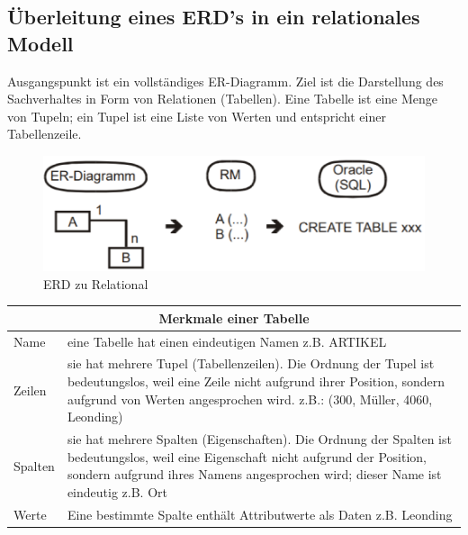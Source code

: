 \subsection{Überleitung eines ERD’s in ein relationales Modell}

Ausgangspunkt ist ein vollständiges ER-Diagramm. Ziel ist die Darstellung des Sachverhaltes in Form von Relationen (Tabellen). Eine Tabelle ist eine Menge von Tupeln; ein Tupel ist eine Liste von Werten und entspricht einer Tabellenzeile.

\begin{figure}[H]
    \centering
    \includegraphics[width=.8\textwidth]{Content/images/modellierung/erdtor.png}
    \caption{ERD zu Relational}
    \label{fig:modellierung:erdtor}
\end{figure}

\begin{center}
    \begin{tabular}{ | l | p{} |}
        \hline
        \multicolumn{2}{|c|}{\textbf{Merkmale einer Tabelle}} \\ \hline
        Name & eine Tabelle hat einen eindeutigen Namen
        z.B. ARTIKEL \\ \hline
        Zeilen & sie hat mehrere Tupel (Tabellenzeilen). Die Ordnung der Tupel ist bedeutungslos, weil eine Zeile nicht aufgrund ihrer Position, sondern aufgrund von Werten angesprochen wird.
        z.B.: (300, Müller, 4060, Leonding)        \\ \hline
        Spalten & sie hat mehrere Spalten (Eigenschaften). Die Ordnung der Spalten ist bedeutungslos, weil eine Eigenschaft nicht aufgrund der Position, sondern aufgrund ihres Namens angesprochen wird; dieser Name ist eindeutig
        z.B. Ort   \\ \hline     
        Werte & Eine bestimmte Spalte enthält Attributwerte als Daten
        z.B. Leonding\\ \hline        
    \end{tabular}
\end{center}


